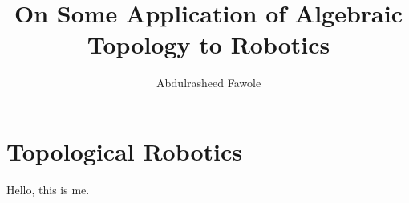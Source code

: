 \documentclass{scrartcl}
\title{On Some Application of Algebraic Topology to Robotics}
\author{Abdulrasheed Fawole}
\date{}
\begin{document}
\maketitle
\section{Topological Robotics}

Hello, this is me.
\end{document}
